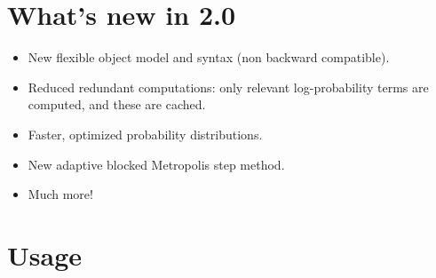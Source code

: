 
\hypertarget{what-s-new-in-2-0}{}
\section*{What's new in 2.0}
\begin{itemize}
\item {} 
New flexible object model and syntax (non backward compatible).

\item {} 
Reduced redundant computations: only relevant log-probability terms are 
computed, and these are cached.

\item {} 
Faster, optimized probability distributions.

\item {} 
New adaptive blocked Metropolis step method.

\item {} 
Much more!

\end{itemize}



\hypertarget{usage}{}
\section*{Usage}

